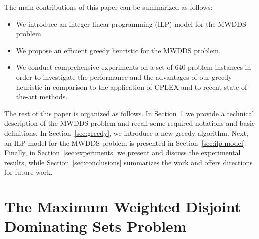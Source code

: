 \documentclass[algorithms,article,accept,moreauthors,pdftex]{Definitions/mdpi}
\begin{document}
 



\noindent The main contributions of this paper can be summarized as follows:
\begin{itemize}
\item We introduce an integer linear programming (ILP) model for the MWDDS problem.
\item We propose an efficient greedy heuristic for the MWDDS problem.
\item We conduct comprehensive experiments on a set of 640 problem instances in order to investigate the performance and the advantages of our greedy heuristic in comparison to the application of CPLEX and to recent state-of-the-art methods.
\end{itemize}

The rest of this paper is organized as follows. In Section~\ref{sec:problem} we provide a technical description of the MWDDS problem and recall some required notations and basic definitions. In Section~\ref{sec:greedy}, we introduce a new greedy algorithm. Next, an ILP model for the MWDDS problem is presented in Section~\ref{sec:ilp-model}. Finally, in Section~\ref{sec:experiments} we present and discuss the experimental results, while Section~\ref{sec:conclusions} summarizes the work and offers directions for future work.

\section{The Maximum Weighted Disjoint Dominating Sets Problem}
\label{sec:problem}
\end{document}
